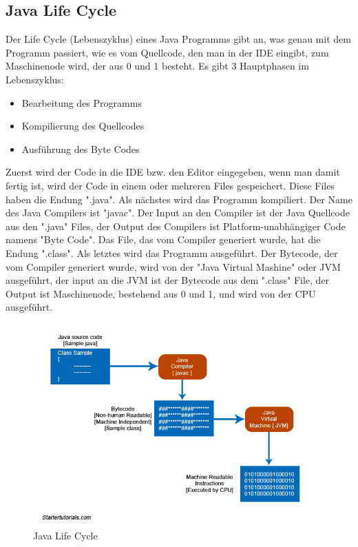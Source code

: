 \subsection{Java Life Cycle}

Der Life Cycle (Lebenszyklus) eines Java Programms gibt an, was genau mit dem Programm passiert, wie es vom Quellcode, den man in der IDE eingibt, zum Maschinenode wird, der aus 0 und 1 besteht.
Es gibt 3 Hauptphasen im Lebenszyklus:
\begin{itemize}
    \item Bearbeitung des Programms
    \item Kompilierung des Quellcodes
    \item Ausführung des Byte Codes
\end{itemize}
Zuerst wird der Code in die IDE bzw. den Editor eingegeben, wenn man damit fertig ist, wird der Code in einem oder mehreren Files gespeichert. Diese Files haben die Endung ".java". 
Als nächstes wird das Programm kompiliert. Der Name des Java Compilers ist "javac". Der Input an den Compiler ist der Java Quellcode aus den ".java" Files, der Output des Compilers 
ist Platform-unabhängiger Code namens "Byte Code". Das File, das vom Compiler generiert wurde, hat die Endung ".class". Als letztes wird das Programm ausgeführt. Der Bytecode, der vom Compiler 
generiert wurde, wird von der "Java Virtual Mashine" oder JVM ausgeführt, der input an die JVM ist der Bytecode aus dem ".class" File, der Output ist Maschinenode, bestehend aus 0 und 1, und wird von der CPU ausgeführt.
\cite{sysarch-java-2}
\begin{figure}[H]
    \centering
    \includegraphics[scale=0.6]{pics/java-life-cycle.jpg}
    \caption{Java Life Cycle}
\end{figure}

